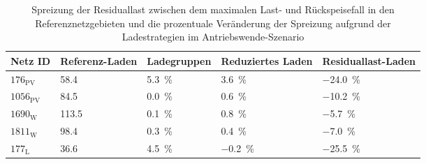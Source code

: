 {
\renewcommand{\arraystretch}{1.2}%
\begin{table}[H]
	\begin{center}
		\caption{Spreizung der Residuallast zwischen dem maximalen Last- und Rückspeisefall in den Referenznetzgebieten und die prozentuale Veränderung der Spreizung aufgrund der Ladestrategien im Antriebswende-Szenario}
		\begin{tabu} to \textwidth {X[0.5] X[1, r] X[1, r] X[1.2, r] X[1.2, r]}
			\toprule
			Netz ID    & Referenz-Laden  & Ladegruppen                               & Reduziertes Laden                          & Residuallast-Laden                         \\ \midrule
			\(176_{\text{PV}}\)  & \SI{58.4}{\mw}  & \SI[retain-explicit-plus]{+5.3}{\percent} & \SI[retain-explicit-plus]{+3.6}{\percent}  & \SI[retain-explicit-plus]{-24.0}{\percent} \\
			\(1056_{\text{PV}}\) & \SI{84.5}{\mw}  & \SI[retain-explicit-plus]{+0.0}{\percent} & \SI[retain-explicit-plus]{+0.6}{\percent}  & \SI[retain-explicit-plus]{-10.2}{\percent} \\
			\(1690_{\text{W}}\) & \SI{113.5}{\mw} & \SI[retain-explicit-plus]{+0.1}{\percent} & \SI[retain-explicit-plus]{+0.8}{\percent}  & \SI[retain-explicit-plus]{-5.7}{\percent}  \\
			\(1811_{\text{W}}\) & \SI{98.4}{\mw}  & \SI[retain-explicit-plus]{+0.3}{\percent} & \SI[retain-explicit-plus]{+0.4}{\percent}  & \SI[retain-explicit-plus]{-7.0}{\percent}  \\
			\(177_{\text{L}}\)  & \SI{36.6}{\mw}  & \SI[retain-explicit-plus]{+4.5}{\percent} & \SI[retain-explicit-plus]{-0.2}{\percent}  & \SI[retain-explicit-plus]{-25.5}{\percent} \\ \bottomrule
		\end{tabu}
		\label{tab:ResidualLoadSpread}
	\end{center}
	\vspace{-3mm}%
\end{table}
}